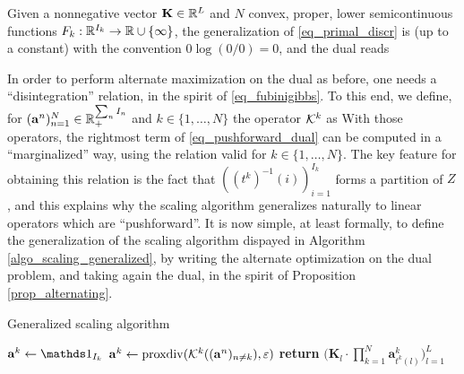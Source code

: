 Given a nonnegative vector $\mathbf{K}\in \mathbb{R}^L$ and $N$ convex, proper, lower semicontinuous functions $F_k:\mathbb{R}^{I_k}\to \mathbb{R}\cup\{\infty\}$, the generalization of \eqref{eq_primal_discr} is (up to a constant)
with the convention $0\log (0/0) = 0$, and the dual reads

In order to perform alternate maximization on the dual as before, one needs a ``disintegration'' relation, in the spirit of \eqref{eq_fubinigibbs}. To this end, we define, for $(\mathbf{a}^n)_{n=1}^N \in \mathbb{R}_+^{\sum_n I_n}$  and $k\in \{1, \dots, N\}$ the operator $\mathcal{K}^k$ as
With those operators, the rightmost term of \eqref{eq_pushforward_dual} can be computed in a ``marginalized'' way, using the relation
valid for $k\in\{1,\dots,N\}$. The key feature for obtaining this relation is the fact that $((t^k)^{-1}(i))_{i=1}^{I_k}$ forms a partition of $Z$, and this explains why the scaling algorithm generalizes naturally to linear operators which are ``pushforward''. It is now simple, at least formally, to define the generalization of the scaling algorithm dispayed in Algorithm \ref{algo_scaling_generalized}, by writing the alternate optimization on the dual problem, and taking again the dual, in the spirit of Proposition \ref{prop_alternating}.
%
\begin{algorithm}
\caption{Generalized scaling algorithm}\label{algo_scaling_generalized}
\begin{algorithmic}[1]
   \State $\mathbf{a}^k \gets \ones_{I_k}$ 
   \Repeat
		\State $\mathbf{a}^k \gets \operatorname{proxdiv}(\mathcal{K}^k((\mathbf{a}^n)_{n\neq k}), \varepsilon)$
   \EndFor
   \State \textbf{return} $\big( \mathbf{K}_l  \cdot \prod_{k=1}^N \mathbf{a}^k_{t^k(l)}\big)_{l=1}^L$
\EndFunction
\end{algorithmic}
\end{algorithm}


